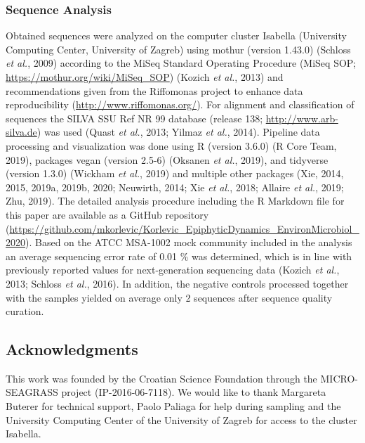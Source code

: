 \documentclass[12pt,]{article}
\begin{document}
\hypertarget{sequence-analysis}{%
\subsubsection{Sequence Analysis}\label{sequence-analysis}}

Obtained sequences were analyzed on the computer cluster Isabella
(University Computing Center, University of Zagreb) using mothur
(version 1.43.0) (Schloss \emph{et al.}, 2009) according to the MiSeq
Standard Operating Procedure (MiSeq SOP;
\url{https://mothur.org/wiki/MiSeq_SOP}) (Kozich \emph{et al.}, 2013)
and recommendations given from the Riffomonas project to enhance data
reproducibility (\url{http://www.riffomonas.org/}). For alignment and
classification of sequences the SILVA SSU Ref NR 99 database (release
138; \url{http://www.arb-silva.de}) was used (Quast \emph{et al.}, 2013;
Yilmaz \emph{et al.}, 2014). Pipeline data processing and visualization
was done using R (version 3.6.0) (R Core Team, 2019), packages vegan
(version 2.5-6) (Oksanen \emph{et al.}, 2019), and tidyverse (version
1.3.0) (Wickham \emph{et al.}, 2019) and multiple other packages (Xie,
2014, 2015, 2019a, 2019b, 2020; Neuwirth, 2014; Xie \emph{et al.}, 2018;
Allaire \emph{et al.}, 2019; Zhu, 2019). The detailed analysis procedure
including the R Markdown file for this paper are available as a GitHub
repository
(\url{https://github.com/mkorlevic/Korlevic_EpiphyticDynamics_EnvironMicrobiol_2020}).
Based on the ATCC MSA-1002 mock community included in the analysis an
average sequencing error rate of 0.01 \si{\percent} was determined,
which is in line with previously reported values for next-generation
sequencing data (Kozich \emph{et al.}, 2013; Schloss \emph{et al.},
2016). In addition, the negative controls processed together with the
samples yielded on average only 2 sequences after sequence quality
curation.

\hypertarget{acknowledgments}{%
\subsection{Acknowledgments}\label{acknowledgments}}

This work was founded by the Croatian Science Foundation through the
MICRO-SEAGRASS project (IP-2016-06-7118). We would like to thank
Margareta Buterer for technical support, Paolo Paliaga for help during
sampling and the University Computing Center of the University of Zagreb
for access to the cluster Isabella.

\newpage
\end{document}
